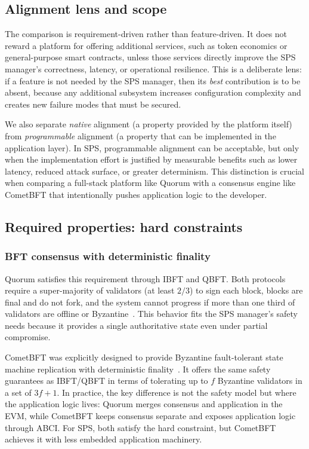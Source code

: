 \subsection{Alignment lens and scope}
The comparison is requirement-driven rather than feature-driven. It does not reward a platform for offering additional services, such as token economics or general-purpose smart contracts, unless those services directly improve the SPS manager's correctness, latency, or operational resilience. This is a deliberate lens: if a feature is not needed by the SPS manager, then its \emph{best} contribution is to be absent, because any additional subsystem increases configuration complexity and creates new failure modes that must be secured.

We also separate \emph{native} alignment (a property provided by the platform itself) from \emph{programmable} alignment (a property that can be implemented in the application layer). In SPS, programmable alignment can be acceptable, but only when the implementation effort is justified by measurable benefits such as lower latency, reduced attack surface, or greater determinism. This distinction is crucial when comparing a full-stack platform like Quorum with a consensus engine like CometBFT that intentionally pushes application logic to the developer.

\subsection{Required properties: hard constraints}

\subsubsection{BFT consensus with deterministic finality}
Quorum satisfies this requirement through IBFT and QBFT. Both protocols require a super-majority of validators (at least $2/3$) to sign each block, blocks are final and do not fork, and the system cannot progress if more than one third of validators are offline or Byzantine~\cite{QBFTCons90:online, moniz2020istanbul}. This behavior fits the SPS manager's safety needs because it provides a single authoritative state even under partial compromise.

CometBFT was explicitly designed to provide Byzantine fault-tolerant state machine replication with deterministic finality~\cite{buchman2018latest, cometbft}. It offers the same safety guarantees as IBFT/QBFT in terms of tolerating up to $f$ Byzantine validators in a set of $3f+1$. In practice, the key difference is not the safety model but where the application logic lives: Quorum merges consensus and application in the EVM, while CometBFT keeps consensus separate and exposes application logic through ABCI. For SPS, both satisfy the hard constraint, but CometBFT achieves it with less embedded application machinery.

